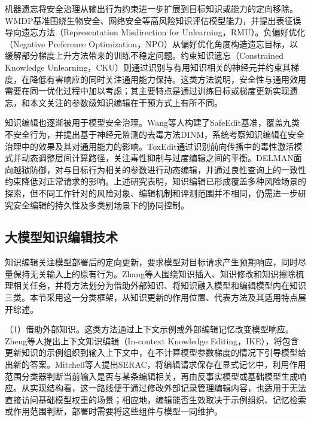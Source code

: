机器遗忘将安全治理从输出行为约束进一步扩展到目标知识或能力的定向移除。WMDP基准围绕生物安全、网络安全等高风险知识评估模型能力，并提出表征误导向遗忘方法（Representation Misdirection for Unlearning，RMU）\cite{li2024wmdp}。负偏好优化（Negative Preference Optimization，NPO）从偏好优化角度构造遗忘目标，以缓解部分梯度上升方法带来的训练不稳定问题\cite{zhang2024npo}。约束知识遗忘（Constrained Knowledge Unlearning，CKU）则通过识别与有用知识相关的神经元并约束其梯度，在降低有害响应的同时关注通用能力保持\cite{shi2025cku}。这类方法说明，安全性与通用效用需要在同一优化过程中加以考虑；其主要特点是通过训练目标或梯度更新实现遗忘，和本文关注的参数级知识编辑在干预方式上有所不同。

知识编辑也逐渐被用于模型安全治理。Wang等人构建了SafeEdit基准，覆盖九类不安全行为，并提出基于神经元监测的去毒方法DINM，系统考察知识编辑在安全治理中的效果及其对通用能力的影响\cite{wang2024safeedit}。ToxEdit通过识别前向传播中的毒性激活模式并动态调整层间计算路径，关注毒性抑制与过度编辑之间的平衡\cite{lu2025toxedit}。DELMAN面向越狱防御，对与目标行为相关的参数进行动态编辑，并通过良性查询上的一致性约束降低对正常请求的影响\cite{wang2025delman}。上述研究表明，知识编辑已形成覆盖多种风险场景的探索，但不同工作针对的风险对象、编辑机制和评测范围并不相同，仍需进一步研究安全编辑的持久性及多类别场景下的协同控制。

\subsection{大模型知识编辑技术}

知识编辑关注模型部署后的定向更新，要求模型对目标请求产生预期响应，同时尽量保持无关输入上的原有行为\cite{mitchell2022serac}。Zhang等人围绕知识插入、知识修改和知识擦除梳理相关任务，并将方法划分为借助外部知识、将知识融入模型和编辑模型内在知识三类\cite{zhang2024comprehensive}。本节采用这一分类框架，从知识更新的作用位置、代表方法及其适用特点展开综述。

（1）借助外部知识。这类方法通过上下文示例或外部编辑记忆改变模型响应。Zheng等人提出上下文知识编辑（In-context Knowledge Editing，IKE），将包含更新知识的示例组织到输入上下文中，在不计算模型参数梯度的情况下引导模型给出新的答案\cite{zheng2023ike}。Mitchell等人提出SERAC，将编辑请求保存在显式记忆中，利用作用范围分类器判断当前输入是否与某条编辑相关，再由反事实模型或基础模型生成响应\cite{mitchell2022serac}。从实现结构看，这一路线便于通过修改外部记录管理编辑内容，也适用于无法直接访问基础模型权重的场景；相应地，编辑能否生效取决于示例组织、记忆检索或作用范围判断，部署时需要将这些组件与模型一同维护。

